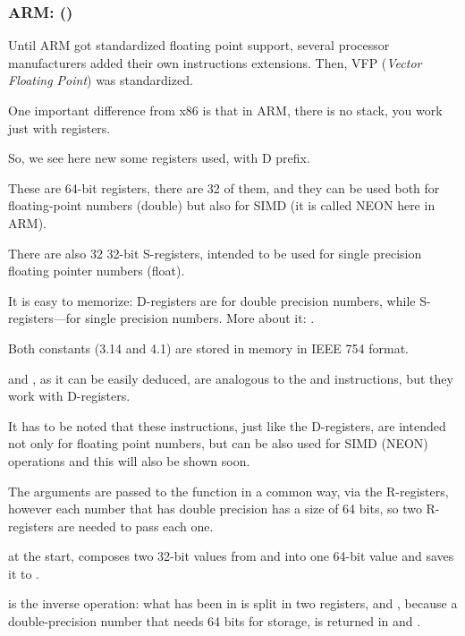 \subsubsection{ARM: \OptimizingXcodeIV (\ARMMode)}

Until ARM got standardized floating point support, several processor manufacturers added their own 
instructions extensions.
Then, VFP (\emph{Vector Floating Point}) was standardized.

One important difference from x86 is that in ARM, there
is no stack, you work just with registers.




So, we see here new some registers used, with D prefix.

These are 64-bit registers, there are 32 of them, and they can be used both for floating-point numbers 
(double) but also for SIMD (it is called NEON here in ARM).

There are also 32 32-bit S-registers, intended to be used for single precision 
floating pointer numbers (float).

It is easy to memorize: D-registers are for double precision numbers, while
S-registers---for single precision numbers.
More about it: .

Both constants (3.14 and 4.1) are stored in memory in IEEE 754 format.

 and , as it can be easily deduced, are analogous to the  and \MOV instructions,
but they work with D-registers.

It has to be noted that these instructions, just like the D-registers, are intended not only for
floating point numbers, 
but can be also used for SIMD (NEON) operations and this will also be shown soon.

The arguments are passed to the function in a common way, via the R-registers, however
each number that has double precision has a size of 64 bits, so two R-registers are needed to pass each one.

 at the start, composes two 32-bit values from  and  into one 64-bit value
and saves it to .

 is the inverse operation: what has been in  
is split in two registers,  and , because a double-precision number 
that needs 64 bits for storage, is returned in  and .

